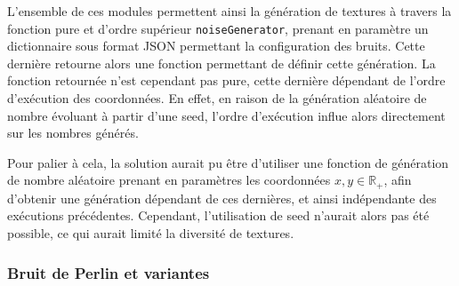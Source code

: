 \documentclass[11pt]{article}
\begin{document}
L'ensemble de ces modules permettent ainsi la génération de textures à travers la fonction pure et d'ordre supérieur \texttt{noiseGenerator}, prenant en paramètre un dictionnaire sous format JSON permettant la configuration des bruits. Cette dernière retourne alors une fonction permettant de définir cette génération. La fonction retournée n'est cependant pas pure, cette dernière dépendant de l'ordre d'exécution des coordonnées. En effet, en raison de la génération aléatoire de nombre évoluant à partir d'une seed, l'ordre d'exécution influe alors directement sur les nombres générés. 

Pour palier à cela, la solution aurait pu être d'utiliser une fonction de génération de nombre aléatoire prenant en paramètres les coordonnées $x,y\in \mathbb{R}_{+}$, afin d'obtenir une génération dépendant de ces dernières, et ainsi indépendante des exécutions précédentes. Cependant, l'utilisation de seed n'aurait alors pas été possible, ce qui aurait limité la diversité de textures.

\subsubsection{Bruit de Perlin et variantes}
\label{section: perlinNoise}
\end{document}
